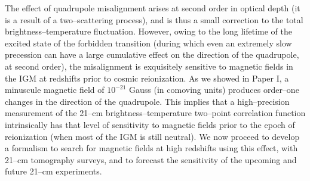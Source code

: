 The effect of quadrupole misalignment arises at second order in optical depth (it is a result of a two--scattering process), and is thus a small correction to the total brightness--temperature fluctuation. However, owing to the long lifetime of the excited state of the forbidden transition (during which even an extremely slow precession can have a large cumulative effect on the direction of the quadrupole, at second order), the misalignment is exquisitely sensitive to magnetic fields in the IGM at redshifts prior to cosmic reionization. As we showed in Paper I, a minuscule magnetic field of  $10^{-21}$ Gauss (in comoving units) produces order--one changes in the direction of the quadrupole. This implies that a high--precision measurement of the 21--cm brightness--temperature two--point correlation function intrinsically has that level of sensitivity to magnetic fields prior to the epoch of reionization (when most of the IGM is still neutral). We now proceed to develop a formalism to search for magnetic fields at high redshifts using this effect, with 21--cm tomography surveys, and to forecast the sensitivity of the upcoming and future 21--cm experiments. 